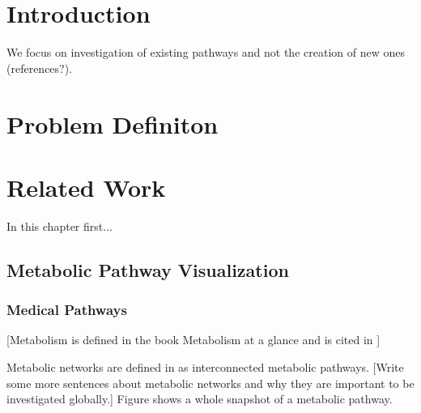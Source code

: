 \chapter{Introduction}

We focus on investigation of existing pathways and not the creation of new ones (references?).

\chapter{Problem Definiton}


\chapter{Related Work}

In this chapter first...

\section{Metabolic Pathway Visualization}

\subsection{Medical Pathways}

[Metabolism is defined in the book Metabolism at a glance and is cited in \citep{Bourqui2006}]

Metabolic networks are defined in \citep{Bourqui2006} as interconnected metabolic pathways.
[Write some more sentences about metabolic networks and why they are important to be investigated globally.]
Figure  shows a whole snapshot of a metabolic pathway.

